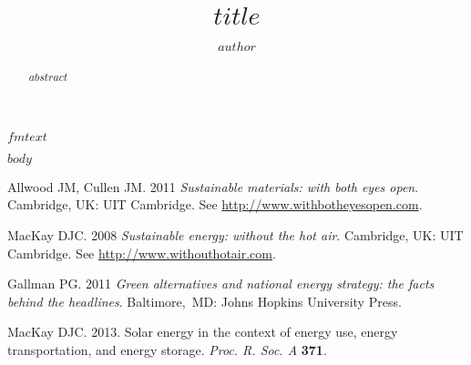 \documentclass[]{rsos}%
\begin{document}
\title{$title$}

\author{$author$}

\address{$address$}

\subject{$subject$}



\begin{abstract}
$abstract$
\end{abstract}


\begin{fmtext}
$fmtext$
\end{fmtext}


\maketitle

$body$

\vskip1pc











\begin{thebibliography}{9}

 Allwood JM, Cullen JM. 2011 \textit{Sustainable materials:  with both eyes open}.
Cambridge, UK: UIT Cambridge. See \href{http://www.withbotheyesopen.com}{http://www.withbotheyesopen.com}.

  MacKay DJC. 2008  \textit{Sustainable energy:  without the hot air}.
 Cambridge, UK: UIT Cambridge. See \href{http://www.withouthotair.com}{http://www.withouthotair.com}.

 Gallman PG. 2011  \textit{Green alternatives and national energy strategy: the facts
 behind the headlines}.  Baltimore,\ MD: Johns Hopkins University Press.

 MacKay DJC. 2013.  Solar energy in the context of energy use, energy transportation, and
 energy storage. \textit{Proc. R. Soc. A} \textbf{371}.

\end{thebibliography}
\end{document}
